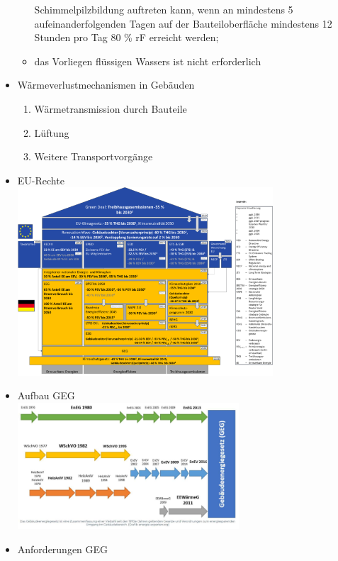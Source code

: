 \documentclass[fleqn,twoside,dvipsnames]{article}
\begin{document}
\begin{itemize}
\begin{itemize}
                    Schimmelpilzbildung auftreten kann, wenn an mindestens 5
                    aufeinanderfolgenden Tagen auf der Bauteiloberfläche mindestens
                    12 Stunden pro Tag 80 \% rF erreicht werden;
                    \item das Vorliegen flüssigen Wassers ist nicht erforderlich
                \end{itemize}
            \item Wärmeverlustmechanismen in Gebäuden
                \begin{enumerate}
                    \item Wärmetransmission durch Bauteile
                    \item Lüftung
                    \item Weitere Transportvorgänge
                \end{enumerate}
                \newpage
            \item EU-Rechte\\
                \includegraphics[width=0.75\textwidth]{Grafiken/ES/EU Rechte.png}
            \item Aufbau GEG\\
                \includegraphics[width=0.65\textwidth]{Grafiken/ES/GEG Aufbau.png}
                \newpage
            \item Anforderungen GEG\\

\end{itemize}
\end{document}

